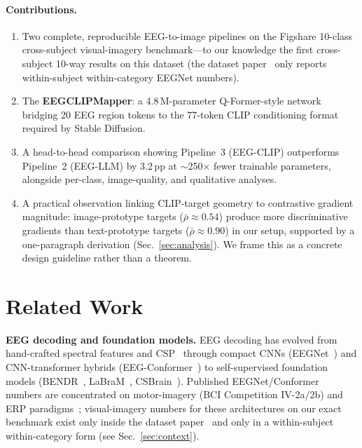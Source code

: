 \documentclass{article}
\begin{document}
\paragraph{Contributions.}
\begin{enumerate}[noitemsep,topsep=2pt]
  \item Two complete, reproducible EEG-to-image pipelines on the Figshare 10-class cross-subject visual-imagery benchmark---to our knowledge the first cross-subject 10-way results on this dataset (the dataset paper~\citep{figshare_paper} only reports within-subject within-category EEGNet numbers).
  \item The \textbf{EEGCLIPMapper}: a 4.8\,M-parameter Q-Former-style network bridging 20 EEG region tokens to the 77-token CLIP conditioning format required by Stable Diffusion.
  \item A head-to-head comparison showing Pipeline~3 (EEG-CLIP) outperforms Pipeline~2 (EEG-LLM) by 3.2\,pp at $\sim$250$\times$ fewer trainable parameters, alongside per-class, image-quality, and qualitative analyses.
  \item A practical observation linking CLIP-target geometry to contrastive gradient magnitude: image-prototype targets ($\bar{\rho}\!\approx\!0.54$) produce more discriminative gradients than text-prototype targets ($\bar{\rho}\!\approx\!0.90$) in our setup, supported by a one-paragraph derivation (Sec.~\ref{sec:analysis}). We frame this as a concrete design guideline rather than a theorem.
\end{enumerate}

\section{Related Work}

\textbf{EEG decoding and foundation models.} EEG decoding has evolved from hand-crafted spectral features and CSP~\citep{blankertz2007bci} through compact CNNs (EEGNet~\citep{lawhern2018eegnet}) and CNN-transformer hybrids (EEG-Conformer~\citep{song2023eegconformer}) to self-supervised foundation models (BENDR~\citep{kostas2022bendr}, LaBraM~\citep{jiang2024labram}, CSBrain~\citep{zhu2024csbrain}). Published EEGNet/Conformer numbers are concentrated on motor-imagery (BCI Competition IV-2a/2b) and ERP paradigms~\citep{lawhern2018eegnet,song2023eegconformer}; visual-imagery numbers for these architectures on our exact benchmark exist only inside the dataset paper~\citep{figshare_paper} and only in a within-subject within-category form (see Sec.~\ref{sec:context}).
\end{document}
